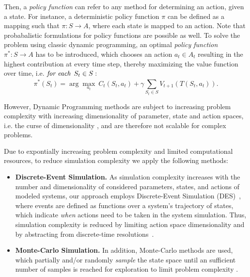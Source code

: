 \documentclass[a4paper,twoside]{article}
\begin{document}
	Then, a \textit{policy function} can refer to any method for determining an action, given a state. For instance, a deterministic policy function $\pi$ can be defined as a mapping such that $\pi : S \to A$, where each state is mapped to an action. Note that probabalistic formulations for policy functions are possible as well.
	To solve the problem using classic dynamic programming, an optimal \textit{policy function} $\pi^* : S \to A$ has to be introduced, which chooses an action $a_t \in \mathit{A_t}$ resulting in the highest contribution at every time step, thereby maximizing the value function over time, i.e. $\textit{for each} \enskip S_t \in S:$
	\begin{equation}
		\pi^*(S_t) = \arg \max_{a_t}\ C_t(S_t,a_t) + \gamma \sum_{S_t \in S}^{}V_{t+1}(T(S_t,a_t)) \mathrm{.}
	\end{equation}
	
	However, Dynamic Programming methods are subject to increasing problem complexity with increasing dimensionality of parameter, state and action spaces, i.e. the curse of dimensionality \cite{bellman_dynamic_1957}, and are therefore not scalable for complex problems.
	
	Due to expontially increasing problem complexity and limited computational resources, to reduce simulation complexity we apply the following methods:

\begin{itemize}
	\item \textbf{Discrete-Event Simulation.} As simulation complexity increases with the number and dimensionality of considered parameters, states, and actions of modeled systems, our approach employs Discrete-Event Simulation (DES)~\cite{fishman2001discrete}, where events are defined as functions over a system's trajectory of states, which indicate \textit{when} actions need to be taken in the system simulation.	Thus, simulation complexity is reduced by limiting action space dimensionality and by abstracting from discrete-time resolutions~\cite{ascher2023discrete}.
	\item \textbf{Monte-Carlo Simulation.} In addition, Monte-Carlo methods are used, which partially and/or randomly \textit{sample} the state space until an sufficient number of samples is reached for exploration to limit problem complexity \cite{ascher_hackenberg_2015}. 
\end{itemize}
\end{document}
